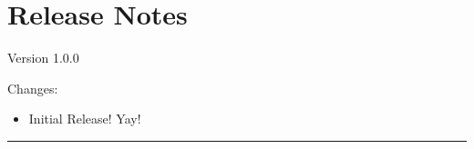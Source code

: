 \section{Release Notes}

%
%

Version 1.0.0

Changes:
\begin{itemize}
	\item Initial Release! Yay!
\end{itemize}

\noindent\rule{14cm}{0.4pt}

